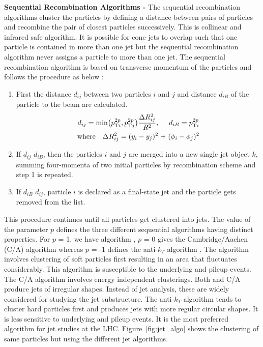 {\bf Sequential Recombination Algorithms -} The sequential recombination algorithms \cite{Ellis:1993tq} cluster the particles by defining a distance between pairs of particles and recombine the pair of closest particles successively. This is collinear and infrared safe algorithm. It is possible for cone jets to overlap such that one particle is contained in more than one jet but the sequential recombination algorithm never assigns a particle to more than one jet. The sequential recombination algorithm is based on transverse momentum \pt of the particles and follows the procedure as below : 
\begin{enumerate}
\item First the distance $d_{ij}$ between two particles $i$ and $j$ and distance $d_{iB}$ of the particle to the beam are calculated.\\
\begin{equation}
\begin{gathered}
d_{ij} = {\rm min}\big(p^{2p}_{{\rm T}i},p^{2p}_{{\rm T}j}\big) \frac{\Delta R^2_{ij}}{R^2}, ~~~~d_{iB} = p^{2p}_{{\rm T}i} \\ {\rm where} ~~~\Delta R^2_{ij} = (y_i -y_j)^{2} ~\plus (\phi_i -\phi_j)^{2}
\end{gathered}
\end{equation}

\item If $d_{ij}$ \ls $d_{iB}$, then the particles $i$ and $j$ are merged into a new single jet object $k$, summing four-momenta of two initial particles by recombination scheme and step 1 is repeated. 
\item If $d_{iB}$ \ls $d_{ij}$, particle $i$ is declared as a final-state jet and the particle gets removed from the list. 
\end{enumerate}
This procedure continues until all particles get clustered into jets. The value of the parameter $p$ defines the three different sequential algorithms having distinct properties. For $p$ = 1, we have \kt algorithm \cite{Catani:1993hr,Catani:1992zp}, $p$ = 0 gives the Cambridge/Aachen (C/A) algorithm \cite{Dokshitzer:1997in} whereas $p$ = -1 defines the anti-$k_{T}$ algorithm \cite{Cacciari:2008gp}. The \kt algorithm involves clustering of soft particles first resulting in an area that fluctuates considerably. This algorithm is susceptible to the underlying and pileup events. The C/A algorithm involves energy independent clusterings. Both \kt and C/A produce jets of irregular shapes. Instead of jet analysis, these are widely considered for studying the jet substructure. The anti-$k_{T}$ algorithm tends to cluster hard particles first and produces jets with more regular circular shapes. It is less sensitive to underlying and pileup events. It is the most preferred algorithm for jet studies at the LHC. Figure~\ref{fig:jet_algo} shows the clustering of same particles but using the different jet algorithms. 

